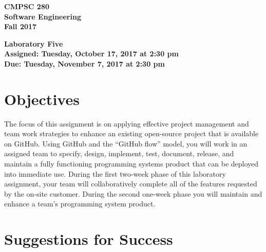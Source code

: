 \documentclass[11pt]{article}
\newcommand{\assignmentduedate}{November 7}
\newcommand{\assignmentassignedate}{October 17}
\newcommand{\assignmentnumber}{Five}
\newcommand{\labyear}{2017}
\newcommand{\labday}{Tuesday}
\newcommand{\labtime}{2:30 pm}
\newcommand{\assigneddate}{Assigned: \labday, \assignmentassignedate, \labyear{} at \labtime{}}
\newcommand{\duedate}{Due: \labday, \assignmentduedate, \labyear{} at \labtime{}}
\newcommand{\labtitle}[1]
{
  \begin{center}
    \begin{center}
      \bf
      CMPSC 280\\Software Engineering\\
      Fall 2017\\
      \medskip
    \end{center}
    \bf
    #1
  \end{center}
}
\begin{document}
\thispagestyle{empty}

\labtitle{Laboratory \assignmentnumber{} \\ \assigneddate{} \\ \duedate{}}

\section*{Objectives}

The focus of this assignment is on applying effective project management and team work strategies to enhance an existing
open-source project that is available on GitHub. Using GitHub and the ``GitHub flow'' model, you will work in an
assigned team to specify, design, implement, test, document, release, and maintain a fully functioning programming
systems product that can be deployed into immediate use. During the first two-week phase of this laboratory assignment,
your team will collaboratively complete all of the features requested by the on-site customer. During the second
one-week phase you will maintain and enhance a team's programming system product.

\section*{Suggestions for Success}
\end{document}
